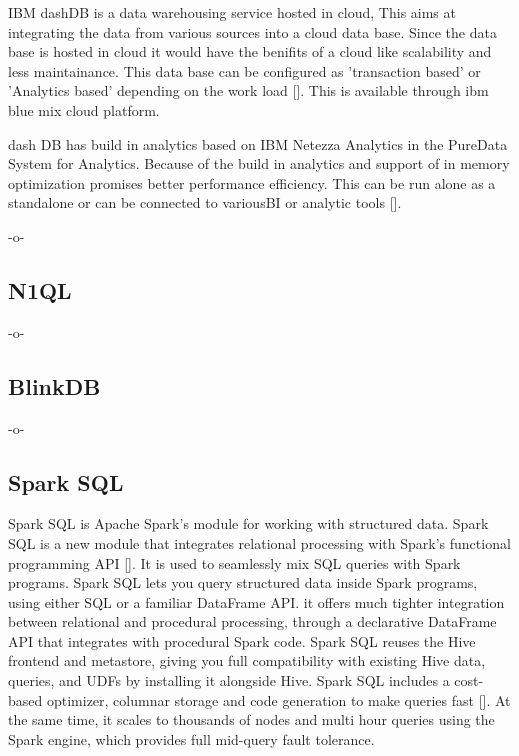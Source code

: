 IBM dashDB is a data warehousing service hosted in cloud, This aims
at integrating the data from various sources into a cloud data
base. Since the data base is hosted in cloud it would have the
benifits of a cloud like scalability and less maintainance. This data
base can be configured as 'transaction based' or 'Analytics based'
depending on the work load [\cite{www-ibm-dash-db.com}]. This is
available through ibm blue mix cloud platform.

dash DB has build in analytics based on IBM Netezza Analytics in the
PureData System for Analytics. Because of the build in analytics and
support of in memory optimization promises better performance
efficiency.  This can be run alone as a standalone or can be connected
to variousBI or analytic tools [\cite{www-ibm-analytics.com}].

     -o-
       
\subsection{N1QL}

-o-

\subsection{BlinkDB}

-o-

\subsection{Spark SQL}

Spark SQL is Apache Spark's module for working with structured
data. Spark SQL is a new module that integrates relational processing
with Spark's functional programming API [\cite{www-spark-sql}]. It is
used to seamlessly mix SQL queries with Spark programs. Spark SQL lets
you query structured data inside Spark programs, using either SQL or a
familiar DataFrame API.  it offers much tighter integration between
relational and procedural processing, through a declarative DataFrame
API that integrates with procedural Spark code.  Spark SQL reuses the
Hive frontend and metastore, giving you full compatibility with
existing Hive data, queries, and UDFs by installing it alongside
Hive. Spark SQL includes a cost-based optimizer, columnar storage and
code generation to make queries fast [\cite{www-spark-sql-2}]. At the
same time, it scales to thousands of nodes and multi hour queries
using the Spark engine, which provides full mid-query fault tolerance.

